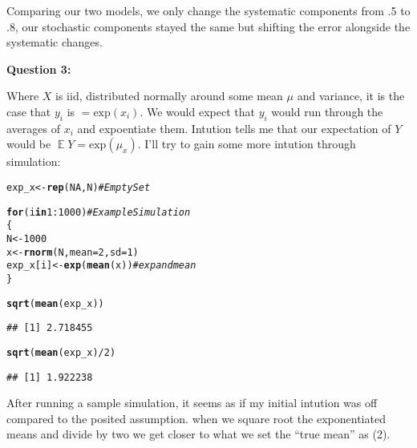 \documentclass[12pt]{article}\usepackage[]{graphicx}\usepackage[]{color}
\makeatletter
\newcommand{\hlnum}[1]{\textcolor[rgb]{0.686,0.059,0.569}{#1}}%
\newcommand{\hlcom}[1]{\textcolor[rgb]{0.678,0.584,0.686}{\textit{#1}}}%
\newcommand{\hlopt}[1]{\textcolor[rgb]{0,0,0}{#1}}%
\newcommand{\hlstd}[1]{\textcolor[rgb]{0.345,0.345,0.345}{#1}}%
\newcommand{\hlkwa}[1]{\textcolor[rgb]{0.161,0.373,0.58}{\textbf{#1}}}%
\newcommand{\hlkwb}[1]{\textcolor[rgb]{0.69,0.353,0.396}{#1}}%
\newcommand{\hlkwc}[1]{\textcolor[rgb]{0.333,0.667,0.333}{#1}}%
\newcommand{\hlkwd}[1]{\textcolor[rgb]{0.737,0.353,0.396}{\textbf{#1}}}%
\newenvironment{kframe}{%
 \def\at@end@of@kframe{}%
 \ifinner\ifhmode%
  \def\at@end@of@kframe{\end{minipage}}%
  \begin{minipage}{\columnwidth}%
 \fi\fi%
 \def\FrameCommand##1{\hskip\@totalleftmargin \hskip-\fboxsep
 \colorbox{shadecolor}{##1}\hskip-\fboxsep
     \hskip-\linewidth \hskip-\@totalleftmargin \hskip\columnwidth}%
 \MakeFramed {\advance\hsize-\width
   \@totalleftmargin\z@ \linewidth\hsize
   \@setminipage}}%
 {\par\unskip\endMakeFramed%
 \at@end@of@kframe}
\newenvironment{knitrout}{}{} %
\DeclareMathOperator{\E}{\mathbb{E}}
\makeatother
\begin{document}
\begin{flushleft}
\clearpage
Comparing our two models, we only change the systematic components from .5 to .8, our stochastic components stayed the same but shifting the error alongside the systematic changes. 





\hfill 

\textbf{Question 3:}

Where $X$ is iid, distributed normally around some mean $\mu$ and variance, it is the case that $y_i$ is $= \text{exp}(x_i)$. We would expect that $y_i$ would run through the averages of $x_i$ and expoentiate them. Intution tells me that our expectation of $Y$ would be $\E{Y}=\text{exp}(\mu_x)$. I'll try to gain some more intution through simulation:

\begin{knitrout}
\color{fgcolor}\begin{kframe}
\begin{alltt}
\hlstd{exp_x} \hlkwb{<-} \hlkwd{rep}\hlstd{(}\hlnum{NA}\hlstd{, N)} \hlcom{#Empty Set}

\hlkwa{for}\hlstd{(i} \hlkwa{in} \hlnum{1}\hlopt{:}\hlnum{1000}\hlstd{)} \hlcom{#Example Simulation}
\hlstd{\{}
  \hlstd{N} \hlkwb{<-} \hlnum{1000}
  \hlstd{x} \hlkwb{<-} \hlkwd{rnorm}\hlstd{(N,} \hlkwc{mean}\hlstd{=}\hlnum{2}\hlstd{,} \hlkwc{sd}\hlstd{=}\hlnum{1}\hlstd{)}
  \hlstd{exp_x[i]} \hlkwb{<-} \hlkwd{exp}\hlstd{(}\hlkwd{mean}\hlstd{(x))} \hlcom{#exp and mean}
\hlstd{\}}

\hlkwd{sqrt}\hlstd{(}\hlkwd{mean}\hlstd{(exp_x))}
\end{alltt}
\begin{verbatim}
## [1] 2.718455
\end{verbatim}
\begin{alltt}
\hlkwd{sqrt}\hlstd{(}\hlkwd{mean}\hlstd{(exp_x)}\hlopt{/}\hlnum{2}\hlstd{)}
\end{alltt}
\begin{verbatim}
## [1] 1.922238
\end{verbatim}
\end{kframe}
\end{knitrout}

After running a sample simulation, it seems as if my initial intution was off compared to the posited assumption. when we square root the exponentiated means and divide by two we get closer to what we set the ``true mean'' as (2).

\hfill


\end{flushleft}
\end{document}
